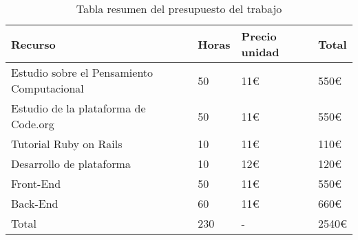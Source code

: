 \begin{table}[!ht]
\begin{center}
\begin{tabular}{|p{60mm}|p{20mm}|p{40mm}|p{25mm}|} \hline 
\textbf{Recurso} & \textbf{Horas} & \textbf{Precio unidad} & \textbf{Total}\\ \hline
Estudio sobre el Pensamiento Computacional & 50 & 11\euro & 550\euro \\ \hline

Estudio de la plataforma de Code.org & 50 & 11\euro & 550\euro \\ \hline

Tutorial Ruby on Rails & 10 & 11\euro & 110\euro \\ \hline

Desarrollo de plataforma & 10 & 12\euro & 120\euro \\ \hline

Front-End & 50 & 11\euro & 550\euro \\ \hline

Back-End & 60 & 11\euro & 660\euro \\ \hline

Total & 230 & - & 2540\euro \\ \hline

\end{tabular}
\end{center}
\caption{Tabla resumen del presupuesto del trabajo}
\label{table:resOthers}
\end{table}